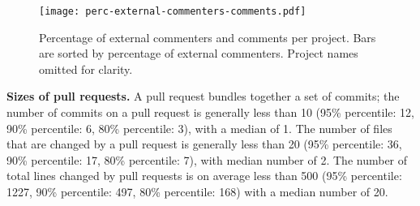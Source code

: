 \documentclass{sig-alternate}
\begin{document}
%
\begin{figure}
\centering
\texttt{[image: perc-external-commenters-comments.pdf]}
\label{fig:pull-num-comments}
\caption{Percentage of external commenters and comments per project. Bars
are sorted by percentage of external commenters. Project names omitted for
clarity.}
\end{figure}

\textbf{Sizes of pull requests.}
A pull request bundles together a set of commits; the number of commits on a
pull request is generally less than 10 (95\% percentile: 12, 90\% percentile: 6,
80\% percentile: 3), with a median of 1. The number of files that are changed by
a pull request is generally less than 20 (95\% percentile: 36, 90\% percentile:
17, 80\% percentile: 7), with median number of 2. The number of total lines
changed by pull requests is on average less than 500 (95\% percentile: 1227,
90\% percentile: 497, 80\% percentile: 168) with a median number of 20.
\end{document}
